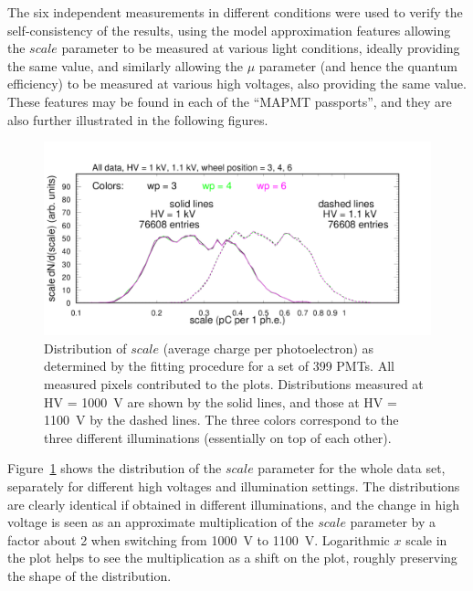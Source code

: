 The six independent measurements in different conditions were used to verify the self-consistency of the results, using the model approximation features allowing the $scale$ parameter to be measured at various light conditions, ideally providing the same value, and similarly allowing the $\mu$ parameter (and hence the quantum efficiency) to be measured at various high voltages, also providing the same value. These features may be found in each of the ``MAPMT passports'', and they are also further illustrated in the following figures. \begin{figure}[h!]
	\centering
	\includegraphics[width=0.98\linewidth,trim=0 12 50 35,clip]{figures/pglobal_sc.pdf}
	\caption{Distribution of $scale$ (average charge per photoelectron) as determined by the fitting procedure for a set of 399 PMTs. All measured pixels contributed to the plots. Distributions measured at HV = 1000~V are shown by the solid lines, and those at HV = 1100~V by the dashed lines. The three colors correspond to the three different illuminations (essentially on top of each other).
	}
	\label{fig:pglobal_sc}
\end{figure}
Figure~\ref{fig:pglobal_sc} shows the distribution of the $scale$ parameter for the whole data set, separately for different high voltages and illumination settings. The distributions are clearly identical if obtained in different illuminations, and the change in high voltage is seen as an approximate multiplication of the $scale$ parameter by a factor about 2 when switching from 1000~V to 1100~V. Logarithmic $x$ scale in the plot helps to see the multiplication as a shift on the plot, roughly preserving the shape of the distribution. 

